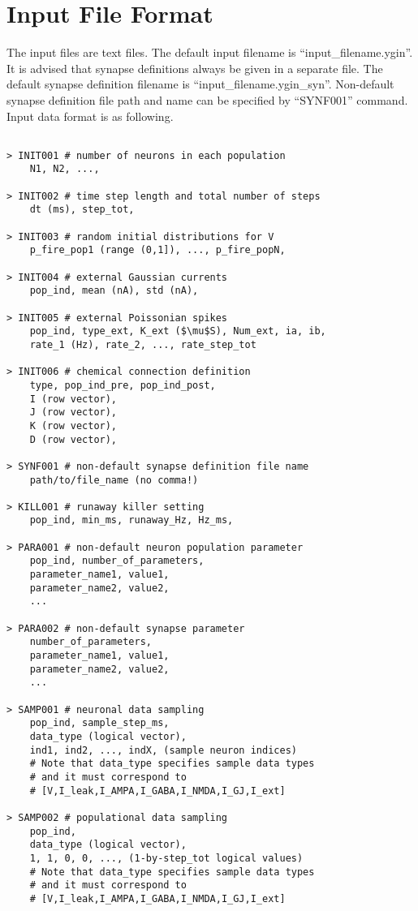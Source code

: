 \documentclass{article}
\begin{document}
\section{Input File Format}

The input files are text files.
The default input filename is ``input\_filename.ygin''.
It is advised that synapse definitions always be given in a separate file.
The default synapse definition filename is ``input\_filename.ygin\_syn''.
Non-default synapse definition file path and name can be specified by ``SYNF001'' command.
Input data format is as following.




\begin{lstlisting}[mathescape]

> INIT001 # number of neurons in each population
	N1, N2, ...,

> INIT002 # time step length and total number of steps
	dt (ms), step_tot,

> INIT003 # random initial distributions for V
	p_fire_pop1 (range (0,1]), ..., p_fire_popN, 

> INIT004 # external Gaussian currents
	pop_ind, mean (nA), std (nA), 

> INIT005 # external Poissonian spikes
	pop_ind, type_ext, K_ext ($\mu$S), Num_ext, ia, ib,
	rate_1 (Hz), rate_2, ..., rate_step_tot

> INIT006 # chemical connection definition
	type, pop_ind_pre, pop_ind_post,
	I (row vector),
	J (row vector),
	K (row vector),
	D (row vector),

> SYNF001 # non-default synapse definition file name
	path/to/file_name (no comma!)

> KILL001 # runaway killer setting
	pop_ind, min_ms, runaway_Hz, Hz_ms,

> PARA001 # non-default neuron population parameter
	pop_ind, number_of_parameters,
	parameter_name1, value1,
	parameter_name2, value2,
	...

> PARA002 # non-default synapse parameter
	number_of_parameters,
	parameter_name1, value1,
	parameter_name2, value2,
	...

> SAMP001 # neuronal data sampling 
	pop_ind, sample_step_ms,
	data_type (logical vector),
	ind1, ind2, ..., indX, (sample neuron indices)
	# Note that data_type specifies sample data types
	# and it must correspond to 
	# [V,I_leak,I_AMPA,I_GABA,I_NMDA,I_GJ,I_ext]

> SAMP002 # populational data sampling
	pop_ind,
	data_type (logical vector),
	1, 1, 0, 0, ..., (1-by-step_tot logical values)
	# Note that data_type specifies sample data types
	# and it must correspond to 
	# [V,I_leak,I_AMPA,I_GABA,I_NMDA,I_GJ,I_ext]

\end{lstlisting}
\end{document}
